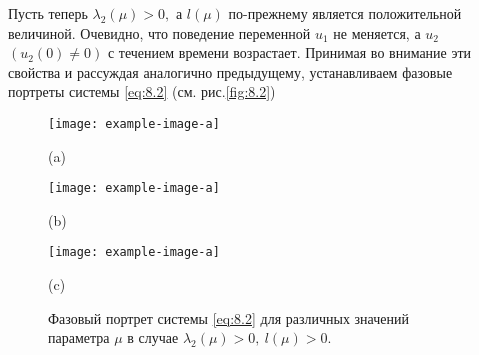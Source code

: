 Пусть теперь $\lambda_2(\mu)>0,$ а $l(\mu)$ по-прежнему является положительной величиной. 
Очевидно, что поведение переменной $u_1$ не меняется, а $u_2$ $(u_2(0)\neq 0)$ с течением времени возрастает. Принимая во внимание эти свойства и рассуждая аналогично предыдущему, устанавливаем фазовые портреты
системы \eqref{eq:8.2} (см. рис.\ref{fig:8.2})
\begin{figure}[h]
        \begin{minipage}{0.32\linewidth}
            \centering
            \texttt{[image: example-image-a]} 

            (a)
        \end{minipage}
        \begin{minipage}{0.32\linewidth}
            \centering
            \texttt{[image: example-image-a]} 

            (b)
        \end{minipage}
        \begin{minipage}{0.32\linewidth}
            \centering
            \texttt{[image: example-image-a]} 

            (c)
        \end{minipage}
        \caption{Фазовый портрет системы \eqref{eq:8.2} для различных значений параметра
        $\mu$ в случае $\lambda_2(\mu)>0,~l(\mu) >0.$}
        \label{fig:8.1}
\end{figure}


